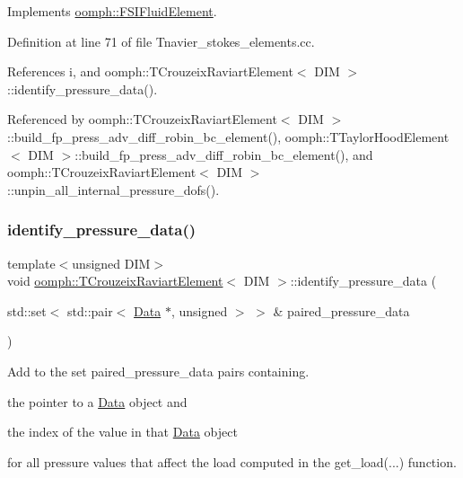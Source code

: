 Implements \hyperlink{classoomph_1_1FSIFluidElement_a13c5f835cddd1b78e6d2582733619300}{oomph\+::\+F\+S\+I\+Fluid\+Element}.



Definition at line 71 of file Tnavier\+\_\+stokes\+\_\+elements.\+cc.



References i, and oomph\+::\+T\+Crouzeix\+Raviart\+Element$<$ D\+I\+M $>$\+::identify\+\_\+pressure\+\_\+data().



Referenced by oomph\+::\+T\+Crouzeix\+Raviart\+Element$<$ D\+I\+M $>$\+::build\+\_\+fp\+\_\+press\+\_\+adv\+\_\+diff\+\_\+robin\+\_\+bc\+\_\+element(), oomph\+::\+T\+Taylor\+Hood\+Element$<$ D\+I\+M $>$\+::build\+\_\+fp\+\_\+press\+\_\+adv\+\_\+diff\+\_\+robin\+\_\+bc\+\_\+element(), and oomph\+::\+T\+Crouzeix\+Raviart\+Element$<$ D\+I\+M $>$\+::unpin\+\_\+all\+\_\+internal\+\_\+pressure\+\_\+dofs().

\mbox{\label{classoomph_1_1TCrouzeixRaviartElement_aa79bbce43b6f27acb68f87a5c4a57b9b}} 
\subsubsection{\texorpdfstring{identify\+\_\+pressure\+\_\+data()}{identify\_pressure\_data()}}
{\footnotesize\ttfamily template$<$unsigned D\+IM$>$ \\
void \hyperlink{classoomph_1_1TCrouzeixRaviartElement}{oomph\+::\+T\+Crouzeix\+Raviart\+Element}$<$ D\+IM $>$\+::identify\+\_\+pressure\+\_\+data (\begin{DoxyParamCaption}\item[{std\+::set$<$ std\+::pair$<$ \hyperlink{classoomph_1_1Data}{Data} $\ast$, unsigned $>$ $>$ \&}]{paired\+\_\+pressure\+\_\+data }\end{DoxyParamCaption})\hspace{0.3cm}{\ttfamily [virtual]}}



Add to the set {\ttfamily paired\+\_\+pressure\+\_\+data} pairs containing. 


\begin{DoxyItemize}
\item the pointer to a \hyperlink{classoomph_1_1Data}{Data} object and
\item the index of the value in that \hyperlink{classoomph_1_1Data}{Data} object
\end{DoxyItemize}for all pressure values that affect the load computed in the {\ttfamily get\+\_\+load}(...) function.


